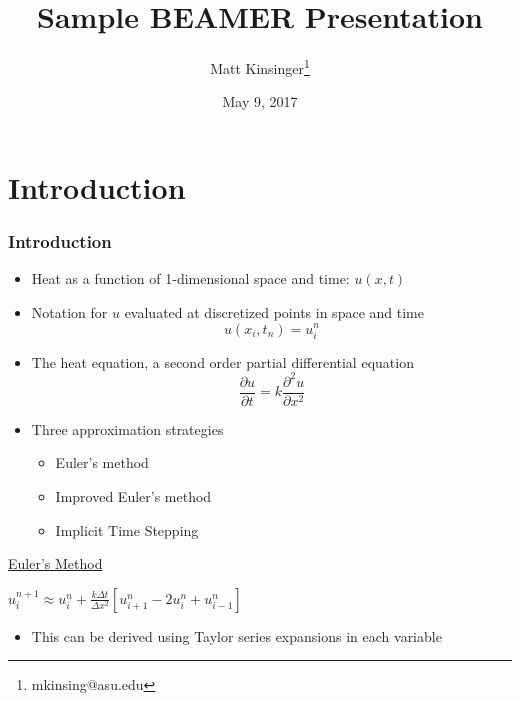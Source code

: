 \documentclass[compress]{beamer}
\title{Sample BEAMER Presentation}
\author{ Matt Kinsinger\thanks{mkinsing@asu.edu} }
\date{May 9, 2017}
\institute[Mathematics and Statistics]{
\texttt{[image: ASUlogo.pdf]} \\
{\color{ASUred} SCHOOL OF \textbf{MATHEMATICAL AND STATISTICAL SCIENCES}}}
\begin{document}
%
%
\begin{frame}[plain]
	\titlepage
	\transboxout
\end{frame}

%
%
\section{Introduction}\label{Introduction}

\begin{frame}\frametitle{Introduction} %
\begin{itemize}
\item Heat as a function of 1-dimensional space and time: $u(x,t)$
\item Notation for $u$ evaluated at discretized points in space and time $$u(x_i,t_n)=u_i^n$$
\item The heat equation, a second order partial differential equation
$$\frac{\partial u}{\partial t}=k\frac{\partial ^2u}{\partial x^2 }$$
\item Three approximation strategies
\begin{itemize}
\item Euler's method
\item Improved Euler's method
\item Implicit Time Stepping
\end{itemize}
\end{itemize}
\end{frame}

\begin{frame}
\begin{center}
\underline{Euler's Method} 
\vspace{.2in}

$u_i^{n+1}\approx u_i^n+\frac{k\Delta t}{\Delta x^2}\left[u_{i+1}^n-2u_i^n+u_{i-1}^n\right]$
\end{center}
\begin{itemize}
\item This can be derived using Taylor series expansions in each variable
\end{itemize}
\end{frame}
\end{document}
